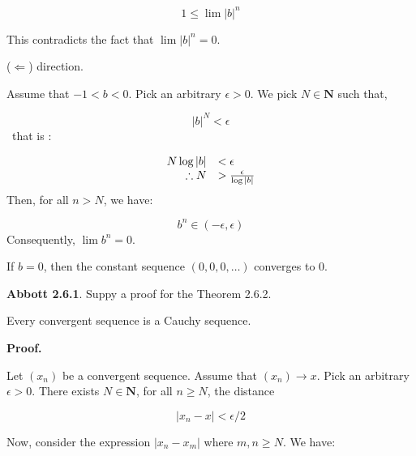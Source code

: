 \documentclass[10pt]{article}
\begin{document}
\begin{equation*}
1\leq \lim |b|^{n}
\end{equation*}


This contradicts the fact that $\displaystyle \lim |b|^{n} =0$.



($\displaystyle \Longleftarrow $) direction.



Assume that $\displaystyle -1< b< 0$. Pick an arbitrary $\displaystyle \epsilon  >0$. We pick $\displaystyle N\in \mathbf{N}$ such that,


\begin{equation*}
|b|^{N} < \epsilon 
\end{equation*}
 \ that is :


\begin{equation*}
\begin{array}{ r l }
N\log |b| & < \epsilon \\
\therefore N &  >\frac{\epsilon }{\log |b|}
\end{array}
\end{equation*}
Then, for all $\displaystyle n >N$, we have:


\begin{equation*}
b^{n} \in ( -\epsilon ,\epsilon )
\end{equation*}
Consequently, $\displaystyle \lim b^{n} =0$. 



If $\displaystyle b=0$, then the constant sequence $\displaystyle ( 0,0,0,\dotsc )$ converges to $\displaystyle 0$.



\textbf{Abbott 2.6.1}. Suppy a proof for the Theorem 2.6.2.



Every convergent sequence is a Cauchy sequence.



\textbf{Proof.}

Let $\displaystyle ( x_{n})$ be a convergent sequence. Assume that $\displaystyle ( x_{n})\rightarrow x$. Pick an arbitrary $\displaystyle \epsilon  >0$. There exists $\displaystyle N\in \mathbf{N}$, for all $\displaystyle n\geq N$, the distance


\begin{equation*}
|x_{n} -x|< \epsilon /2
\end{equation*}


Now, consider the expression $\displaystyle |x_{n} -x_{m} |$ where $\displaystyle m,n\geq N$. We have:
\end{document}
